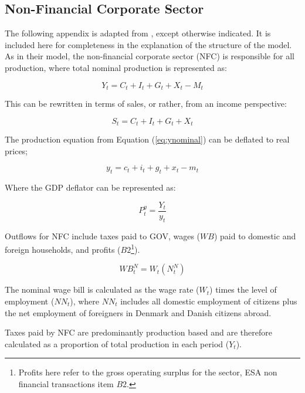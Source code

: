 \documentclass[
]{book}
\begin{document}
\hypertarget{sec:fi-fl-sfc-model-eq-nf}{%
\subsection{Non-Financial Corporate Sector}\label{sec:fi-fl-sfc-model-eq-nf}}

The following appendix is adapted from \citet{byrialsenraza2019empirical}, except otherwise indicated.
It is included here for completeness in the explanation of the structure of
the model. As in their model, the non-financial corporate sector (NFC) is responsible for all production,
where total nominal production is represented as:

\begin{equation}
Y_t = C_t + I_t + G_t + X_t - M_t
\label{eq:ynominal}
\end{equation}

This can be rewritten in terms of sales, or rather, from an income perspective:

\begin{equation}
S_t = C_t + I_t + G_t + X_t
\label{eq:nfcsales}
\end{equation}

The production equation from Equation (\ref{eq:ynominal}) can be deflated to real prices;

\begin{equation}
y_t = c_t + i_t + g_t + x_t - m_t
\end{equation}

Where the GDP deflator can be represented as:

\begin{equation}
P^y_t = \frac{Y_t}{y_t}
\end{equation}

Outflows for NFC include taxes paid to GOV, wages (\(WB\)) paid to domestic and foreign households, and profits (\(B2\)\footnote{Profits here refer to the gross operating surplus for the sector, ESA non financial transactions item \(B2\).}).

\begin{equation}
WB^N_t = W_t(N^N_t)
\end{equation}

The nominal wage bill is calculated as the wage rate (\(W_t\)) times the
level of employment (\(NN_t\)), where \(NN_t\) includes all domestic employment
of citizens plus the net employment of foreigners in Denmark and Danish citizens abroad.

Taxes paid by NFC are predominantly production based and are therefore
calculated as a proportion of total production in each period (\(Y_t\)).
\end{document}
